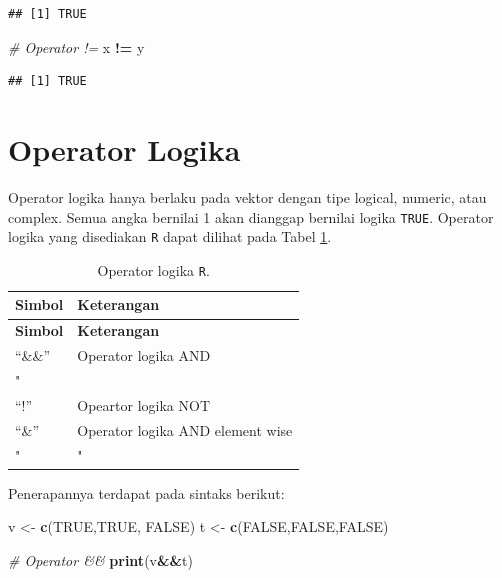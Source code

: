 \documentclass[]{book}
\newenvironment{Shaded}{\begin{snugshade}}{\end{snugshade}}
\newcommand{\CommentTok}[1]{\textcolor[rgb]{0.56,0.35,0.01}{\textit{#1}}}
\newcommand{\KeywordTok}[1]{\textcolor[rgb]{0.13,0.29,0.53}{\textbf{#1}}}
\newcommand{\NormalTok}[1]{#1}
\newcommand{\OperatorTok}[1]{\textcolor[rgb]{0.81,0.36,0.00}{\textbf{#1}}}
\newcommand{\OtherTok}[1]{\textcolor[rgb]{0.56,0.35,0.01}{#1}}
\newcommand{\StringTok}[1]{\textcolor[rgb]{0.31,0.60,0.02}{#1}}
\theoremstyle{definition}
\theoremstyle{definition}
\theoremstyle{definition}
\theoremstyle{remark}
\begin{document}
\begin{verbatim}
## [1] TRUE
\end{verbatim}

\begin{Shaded}
\begin{Highlighting}[]
\CommentTok{# Operator !=}
\NormalTok{x }\OperatorTok{!=}\StringTok{ }\NormalTok{y}
\end{Highlighting}
\end{Shaded}

\begin{verbatim}
## [1] TRUE
\end{verbatim}

\hypertarget{logicoperators}{%
\section{Operator Logika}\label{logicoperators}}

Operator logika hanya berlaku pada vektor dengan tipe logical, numeric, atau complex. Semua angka bernilai 1 akan dianggap bernilai logika \texttt{TRUE}. Operator logika yang disediakan \texttt{R} dapat dilihat pada Tabel \ref{tab:oplogika}.

\begin{longtable}[]{@{}ll@{}}
\caption{\label{tab:oplogika} Operator logika \texttt{R}.}\tabularnewline
\toprule
\textbf{Simbol} & \textbf{Keterangan}\tabularnewline
\midrule
\endfirsthead
\toprule
\textbf{Simbol} & \textbf{Keterangan}\tabularnewline
\midrule
\endhead
``\&\&'' & Operator logika AND\tabularnewline
" &\tabularnewline
``!'' & Opeartor logika NOT\tabularnewline
``\&'' & Operator logika AND element wise\tabularnewline
" & "\tabularnewline
\bottomrule
\end{longtable}

Penerapannya terdapat pada sintaks berikut:

\begin{Shaded}
\begin{Highlighting}[]
\NormalTok{v <-}\StringTok{ }\KeywordTok{c}\NormalTok{(}\OtherTok{TRUE}\NormalTok{,}\OtherTok{TRUE}\NormalTok{, }\OtherTok{FALSE}\NormalTok{)}
\NormalTok{t <-}\StringTok{ }\KeywordTok{c}\NormalTok{(}\OtherTok{FALSE}\NormalTok{,}\OtherTok{FALSE}\NormalTok{,}\OtherTok{FALSE}\NormalTok{)}

\CommentTok{# Operator &&}
\KeywordTok{print}\NormalTok{(v}\OperatorTok{&&}\NormalTok{t)}
\end{Highlighting}
\end{Shaded}
\end{document}
